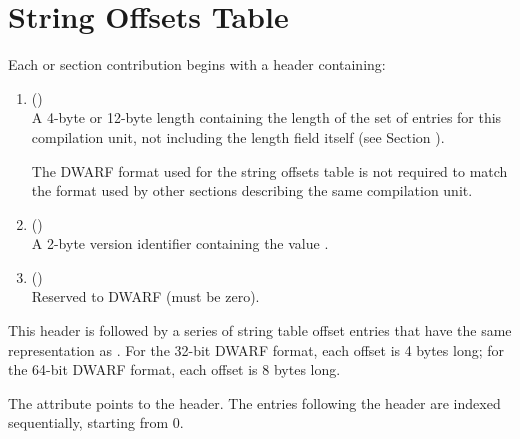 \section{String Offsets Table}
\label{chap:stringoffsetstable}
Each 
\bb
\dotdebugstroffsets{} or \dotdebugstroffsetsdwo{} section
contribution
\eb
begins with a header containing:
\begin{enumerate}[1. ]
\item \HFNunitlength{} () \\
A 4-byte or 12-byte length containing the length of
the set of entries for this compilation unit, not
including the length field itself
\bb
(see Section ).
\eb

\bb
The DWARF format used for the string offsets table is not required to match
the format used by other sections describing the same compilation unit.
\eb

\item  \HFNversion{} (\HFTuhalf) \\
A 2-byte version identifier containing the value
\versiondotdebugstroffsets{}.

\item \HFNpadding{} (\HFTuhalf) \\
Reserved to DWARF (must be zero).
\end{enumerate}

This header is followed by a series of string table 
\bb
offset entries
\eb
that have the same representation as \DWFORMstrp.
For the 32-bit DWARF format, each offset is 4 bytes long; for
the 64-bit DWARF format, each offset is 8 bytes long.

The 
\bb
\DWATstroffsets{} attribute points to the header.
\eb
The entries following the header are indexed sequentially,
\db
starting from 0.

